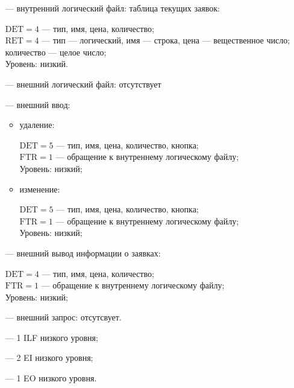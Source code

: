 \begin{itemize}
    \item[---] внутренний логический файл: таблица текущих заявок:

        $\text{DET} = 4$ --- тип, имя, цена, количество;\\
        $\text{RET} = 4$ --- тип --- логический, имя --- строка, цена --- вещественное число; количество --- целое число;\\
        Уровень: низкий.
    
    \item[---] внешний логический файл: отсутствует
    \item[---] внешний ввод:
        \begin{itemize}
            \item удаление:
            
                $\text{DET} = 5$ --- тип, имя, цена, количество, кнопка; \\
                $\text{FTR} = 1$ --- обращение к внутреннему логическому файлу;\\
                Уровень: низкий;
                
            \item изменение:

                $\text{DET} = 5$ --- тип, имя, цена, количество, кнопка; \\
                $\text{FTR} = 1$ --- обращение к внутреннему логическому файлу;\\
                Уровень: низкий;
                
        \end{itemize}
    \item[---] внешний вывод информации о заявках:

        $\text{DET} = 4$ --- тип, имя, цена, количество; \\
        $\text{FTR} = 1$ --- обращение к внутреннему логическому файлу;\\
        Уровень: низкий;
    
    \item[---] внешний запрос: отсутсвует.
\end{itemize}

\begin{itemize}
    \item[---] 1 ILF низкого уровня;
    \item[---] 2 EI низкого уровня;
    \item[---] 1 EO низкого уровня.
\end{itemize}

